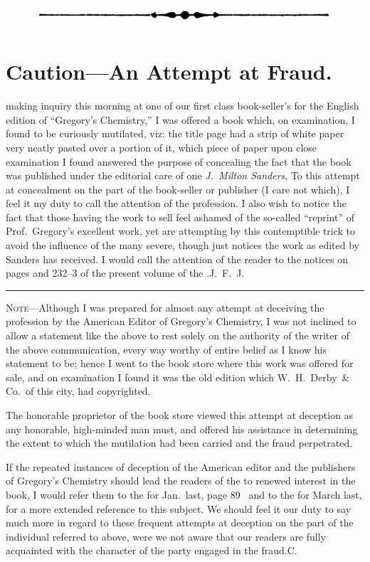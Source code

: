 \begin{figure}[H]
  \centering
  \includegraphics{pages/illustrations/arrow_bullet_divider.jpg}
\end{figure}
\section*{Caution---An Attempt at Fraud.}

 making inquiry this morning at one of our first class book-seller's
for the English edition of ``Gregory's Chemistry,'' I was offered a
book which, on examination, I found to be curiously mutilated, viz:
the title page had a strip of white paper very neatly pasted over a
portion of it, which piece of paper upon close examination I found answered
the purpose of concealing the fact that the book was published
under the editorial care of one \emph{J.~Milton Sanders}, \md{} To this attempt
at concealment on the part of the book-seller or publisher (I care not
which), I feel it my duty to call the attention of the profession. I also
wish to notice the fact that those having the work to sell feel ashamed
of the so-called ``reprint'' of Prof.~Gregory's excellent work, yet are
attempting by this contemptible trick to avoid the influence of the
many severe, though just notices the work as edited by Sanders has received.
I would call the attention of the reader to the notices on pages
 and 232--3 of the present volume of the .\hfill{}J.~F.~J.\quad

\plainbreak{1}

\textsc{Note}---Although I was prepared for almost any attempt at deceiving
the profession by the American Editor of Gregory's Chemistry, I was
not inclined to allow a statement like the above to rest solely on the
authority of the writer of the above communication, every way worthy
of entire belief as I know his statement to be; hence I went to the
book store where this work was offered for sale, and on examination
I found it was the old edition which W.~H.~Derby~\& Co.\ of this city,
had copyrighted.

The honorable proprietor of the book store viewed this attempt at
deception as any honorable, high-minded man must, and offered his
assistance in determining the extent to which the mutilation had been
carried and the fraud perpetrated.

If the repeated instances of deception of the American editor and
the publishers of Gregory's Chemistry should lead the readers of the
 to renewed interest in the book, I would refer them
to the  for Jan.\ last, page 89 \ 
and to the  for March last, for
a more extended reference to this subject. We should feel it our duty
to say much more in regard to these frequent attempts at deception
on the part of the individual referred to above, were we not aware that
our readers are fully acquainted with the character of the party engaged
in the fraud.\hfill{}C.
\endinput
